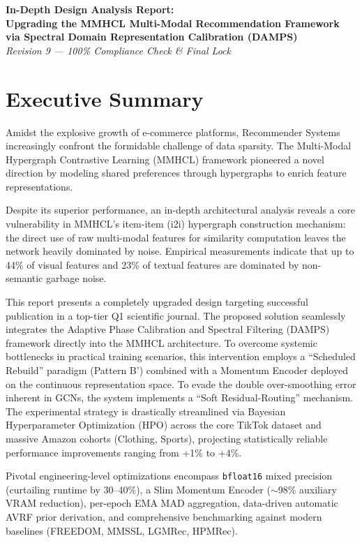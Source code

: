 \documentclass[12pt, a4paper]{article}
\begin{document}
\begin{center}
    \LARGE \textbf{In-Depth Design Analysis Report:\\Upgrading the MMHCL Multi-Modal Recommendation Framework via Spectral Domain Representation Calibration (DAMPS)}\\[0.5em]
    \normalsize \textit{Revision 9 --- 100\% Compliance Check \& Final Lock}
\end{center}
\vspace{1em}

\section*{Executive Summary}
Amidst the explosive growth of e-commerce platforms, Recommender Systems increasingly confront the formidable challenge of data sparsity. The Multi-Modal Hypergraph Contrastive Learning (MMHCL) framework pioneered a novel direction by modeling shared preferences through hypergraphs to enrich feature representations.

Despite its superior performance, an in-depth architectural analysis reveals a core vulnerability in MMHCL's item-item (i2i) hypergraph construction mechanism: the direct use of raw multi-modal features for similarity computation leaves the network heavily dominated by noise. Empirical measurements indicate that up to 44\% of visual features and 23\% of textual features are dominated by non-semantic garbage noise.

This report presents a completely upgraded design targeting successful publication in a top-tier Q1 scientific journal. The proposed solution seamlessly integrates the Adaptive Phase Calibration and Spectral Filtering (DAMPS) framework directly into the MMHCL architecture. To overcome systemic bottlenecks in practical training scenarios, this intervention employs a ``Scheduled Rebuild'' paradigm (Pattern B') combined with a Momentum Encoder deployed on the continuous representation space. To evade the double over-smoothing error inherent in GCNs, the system implements a ``Soft Residual-Routing'' mechanism. The experimental strategy is drastically streamlined via Bayesian Hyperparameter Optimization (HPO) across the core TikTok dataset and massive Amazon cohorts (Clothing, Sports), projecting statistically reliable performance improvements ranging from +1\% to +4\%. 

Pivotal engineering-level optimizations encompass \texttt{bfloat16} mixed precision (curtailing runtime by 30--40\%), a Slim Momentum Encoder ($\sim$98\% auxiliary VRAM reduction), per-epoch EMA MAD aggregation, data-driven automatic AVRF prior derivation, and comprehensive benchmarking against modern baselines (FREEDOM, MMSSL, LGMRec, HPMRec).
\end{document}
